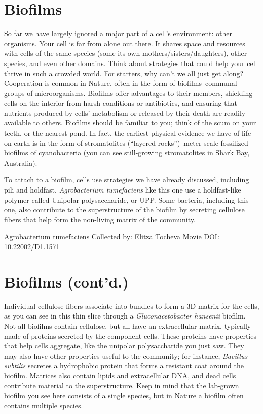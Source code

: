 \documentclass[]{tufte-book}
\begin{document}
\hypertarget{biofilms}{%
\section{Biofilms}\label{biofilms}}

So far we have largely ignored a major part of a cell's environment: other organisms. Your cell is far from alone out there. It shares space and resources with cells of the same species (some its own mothers/sisters/daughters), other species, and even other domains. Think about strategies that could help your cell thrive in such a crowded world. For starters, why can't we all just get along? Cooperation is common in Nature, often in the form of biofilms--communal groups of microorganisms. Biofilms offer advantages to their members, shielding cells on the interior from harsh conditions or antibiotics, and ensuring that nutrients produced by cells' metabolism or released by their death are readily available to others. Biofilms should be familiar to you; think of the scum on your teeth, or the nearest pond. In fact, the earliest physical evidence we have of life on earth is in the form of stromatolites (``layered rocks'')--meter-scale fossilized biofilms of cyanobacteria (you can see still-growing stromatolites in Shark Bay, Australia).

To attach to a biofilm, cells use strategies we have already discussed, including pili and holdfast. \emph{Agrobacterium tumefaciens} like this one use a holdfast-like polymer called Unipolar polysaccharide, or UPP. Some bacteria, including this one, also contribute to the superstructure of the biofilm by secreting cellulose fibers that help form the non-living matrix of the community.



\hypertarget{htmlwidget-a08625a4472c8359a19b}{}

\label{fig:9-1}\protect\hyperlink{tree}{Agrobacterium tumefaciens} Collected by: \protect\hyperlink{elitza_tocheva}{Elitza Tocheva} Movie DOI: \href{https://doi.org/10.22002/D1.1571}{10.22002/D1.1571}

\hypertarget{biofilms-contd.}{%
\section{Biofilms (cont'd.)}\label{biofilms-contd.}}

Individual cellulose fibers associate into bundles to form a 3D matrix for the cells, as you can see in this thin slice through a \emph{Gluconacetobacter hansenii} biofilm. Not all biofilms contain cellulose, but all have an extracellular matrix, typically made of proteins secreted by the component cells. These proteins have properties that help cells aggregate, like the unipolar polysaccharide you just saw. They may also have other properties useful to the community; for instance, \emph{Bacillus subtilis} secretes a hydrophobic protein that forms a resistant coat around the biofilm. Matrices also contain lipids and extracellular DNA, and dead cells contribute material to the superstructure. Keep in mind that the lab-grown biofilm you see here consists of a single species, but in Nature a biofilm often contains multiple species.
\end{document}
